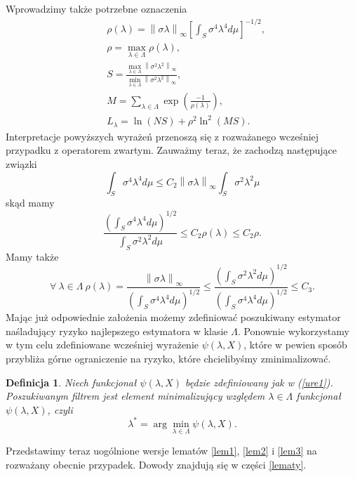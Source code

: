 \documentclass[man,mfiu]{mgrwms}
\newcommand{\norm}[1]{\left\lVert#1\right\rVert}
\newtheorem{df}{Definicja}[chapter]
\begin{document}
Wprowadzimy także potrzebne oznaczenia
\begin{displaymath}
\begin{split}
&\rho(\lambda)=\norm{\sigma\lambda}_{\infty}\left[\int_S\sigma^4\lambda^4d\mu\right]^{-1/2},\\
&\rho=\max_{\lambda\in \Lambda}\rho(\lambda),\\
&S=\frac{\max_{\lambda\in\Lambda}\norm{\sigma^2\lambda^2}_{\infty}}{\min_{\lambda\in \Lambda}\norm{\sigma^2\lambda^2}_{\infty}},\\
&M=\sum_{\lambda\in \Lambda}\exp\left(\frac{-1}{\rho(\lambda)}\right),\\
&L_{\lambda}=\ln(NS)+\rho^2\ln^2(MS).
\end{split}
\end{displaymath}
Interpretacje powyższych wyrażeń przenoszą się z rozważanego wcześniej przypadku z operatorem zwartym. Zauważmy teraz, że zachodzą następujące związki
\begin{displaymath}
\int_S\sigma^4\lambda^4d\mu\leq C_2\norm{\sigma\lambda}_{\infty}\int_S\sigma^2\lambda^2\mu
\end{displaymath}
skąd mamy
\begin{displaymath}
\frac{\left(\int_S\sigma^4\lambda^4d\mu\right)^{1/2}}{\int_S\sigma^2\lambda^2d\mu}\leq C_2\rho (\lambda)\leq C_2\rho.
\end{displaymath}
Mamy także
\begin{displaymath}
\forall\ \lambda\in \Lambda\ \rho (\lambda)=\frac{\norm{\sigma\lambda}_{\infty}}{\left(\int_S\sigma^4\lambda^4d\mu\right)^{1/2}}\leq \frac{\left(\int_S\sigma^2\lambda^2d\mu\right)^{1/2}}{\left(\int_S\sigma^4\lambda^4d\mu\right)^{1/2}}\leq C_3.
\end{displaymath}
Mając już odpowiednie założenia możemy zdefiniować poszukiwany estymator naśladujący ryzyko najlepszego estymatora w klasie $\Lambda$. Ponownie wykorzystamy w tym celu zdefiniowane wcześniej wyrażenie $\psi(\lambda,X)$, które w pewien sposób przybliża górne ograniczenie na  ryzyko, które chcielibyśmy zminimalizować.
\begin{df}
Niech funkcjonał $\psi(\lambda,X)$ będzie zdefiniowany jak w (\ref{ure1}). Poszukiwanym filtrem jest element minimalizujący względem $\lambda\in \Lambda$ funkcjonał $\psi(\lambda,X)$, czyli
\begin{equation}\label{estimator1}
\lambda^*=\arg\min_{\lambda\in \Lambda}\psi(\lambda,X).
\end{equation}
\end{df}
Przedstawimy teraz uogólnione wersje lematów \ref{lem1}, \ref{lem2} i \ref{lem3} na rozważany obecnie przypadek. Dowody znajdują się w części \ref{lematy}.
\end{document}
